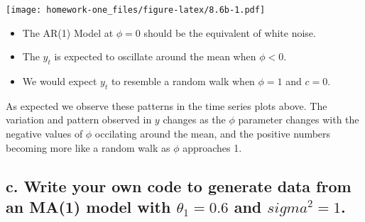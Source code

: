 \documentclass[openany]{book}
\providecommand{\tightlist}{%
  \setlength{\itemsep}{0pt}\setlength{\parskip}{0pt}}
\begin{document}
\texttt{[image: homework-one\_files/figure-latex/8.6b-1.pdf]}

\begin{itemize}
\tightlist
\item
  The AR(1) Model at \(\phi=0\) should be the equivalent of white noise.\\
\item
  The \(y_t\) is expected to oscillate around the mean when \(\phi<0\).\\
\item
  We would expect \(y_t\) to resemble a random walk when \(\phi=1\) and \(c=0\).
\end{itemize}

As expected we observe these patterns in the time series plots above. The variation and pattern observed in \(y\) changes as the \(\phi\) parameter changes with the negative values of \(\phi\) occilating around the mean, and the positive numbers becoming more like a random walk as \(\phi\) approaches 1.

\hypertarget{c.-write-your-own-code-to-generate-data-from-an-ma1-model-with-theta_10.6-and-sigma21.}{%
\subsection{\texorpdfstring{c. Write your own code to generate data from an MA(1) model with \(\theta_1=0.6\) and \(sigma^2=1\).}{c. Write your own code to generate data from an MA(1) model with \textbackslash{}theta\_1=0.6 and sigma\^{}2=1.}}\label{c.-write-your-own-code-to-generate-data-from-an-ma1-model-with-theta_10.6-and-sigma21.}}
\end{document}
